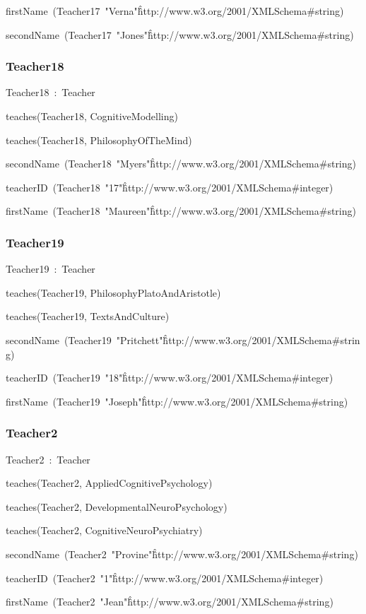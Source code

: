 \documentclass{article}
\begin{document}
firstName~(Teacher17~"Verna"\^\^http://www.w3.org/2001/XMLSchema#string)

secondName~(Teacher17~"Jones"\^\^http://www.w3.org/2001/XMLSchema#string)

\subsubsection*{Teacher18}

Teacher18~:~Teacher

teaches(Teacher18, CognitiveModelling)

teaches(Teacher18, PhilosophyOfTheMind)

secondName~(Teacher18~"Myers"\^\^http://www.w3.org/2001/XMLSchema#string)

teacherID~(Teacher18~"17"\^\^http://www.w3.org/2001/XMLSchema#integer)

firstName~(Teacher18~"Maureen"\^\^http://www.w3.org/2001/XMLSchema#string)

\subsubsection*{Teacher19}

Teacher19~:~Teacher

teaches(Teacher19, PhilosophyPlatoAndAristotle)

teaches(Teacher19, TextsAndCulture)

secondName~(Teacher19~"Pritchett"\^\^http://www.w3.org/2001/XMLSchema#string)

teacherID~(Teacher19~"18"\^\^http://www.w3.org/2001/XMLSchema#integer)

firstName~(Teacher19~"Joseph"\^\^http://www.w3.org/2001/XMLSchema#string)

\subsubsection*{Teacher2}

Teacher2~:~Teacher

teaches(Teacher2, AppliedCognitivePsychology)

teaches(Teacher2, DevelopmentalNeuroPsychology)

teaches(Teacher2, CognitiveNeuroPsychiatry)

secondName~(Teacher2~"Provine"\^\^http://www.w3.org/2001/XMLSchema#string)

teacherID~(Teacher2~"1"\^\^http://www.w3.org/2001/XMLSchema#integer)

firstName~(Teacher2~"Jean"\^\^http://www.w3.org/2001/XMLSchema#string)
\end{document}
